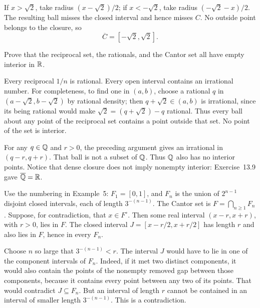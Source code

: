 If $x>\sqrt2$, take radius $(x-\sqrt2)/2$; if
$x<-\sqrt2$, take radius $(-\sqrt2-x)/2$. The resulting
ball misses the closed interval and hence misses $C$.
No outside point belongs to the closure, so
\[
 \boxed{\overline C=[-\sqrt2,\sqrt2].}
\]

\goal Prove that the reciprocal set, the rationals, and the
Cantor set all have empty interior in $\mathbb{R}$.

Every reciprocal $1/n$ is rational. Every open interval contains
an irrational number. For completeness, to find one in $(a,b)$,
choose a rational $q$ in $(a-\sqrt2,b-\sqrt2)$ by rational
density; then $q+\sqrt2\in(a,b)$ is irrational, since its
being rational would make $\sqrt2=(q+\sqrt2)-q$ rational.
Thus every ball about any point of the reciprocal set contains
a point outside that set. No point of the set is interior.

For any $q\in\mathbb{Q}$ and $r>0$, the preceding argument gives an
irrational in $(q-r,q+r)$. That ball is not a subset of $\mathbb{Q}$.
Thus $\mathbb{Q}$ also has no interior points. Notice that dense closure
does not imply nonempty interior: Exercise~13.9 gave
$\overline{\mathbb{Q}}=\mathbb{R}$.

Use the numbering in Example~5: $F_1=[0,1]$, and $F_n$ is
the union of $2^{n-1}$ disjoint closed intervals, each of length
$3^{-(n-1)}$. The Cantor set is $F=\bigcap_{n\ge1}F_n$.
Suppose, for contradiction, that $x\in F^\circ$. Then some
real interval $(x-r,x+r)$, with $r>0$, lies in $F$.
The closed interval $J=[x-r/2,x+r/2]$ has length $r$ and
also lies in $F$, hence in every $F_n$.

Choose $n$ so large that $3^{-(n-1)}<r$. The interval $J$
would have to lie in one of the component intervals of $F_n$.
Indeed, if it met two distinct components, it would also contain
the points of the nonempty removed gap between those components,
because it contains every point between any two of its points.
That would contradict $J\subseteq F_n$.
But an interval of length $r$ cannot be contained in an interval
of smaller length $3^{-(n-1)}$. This is a contradiction.

